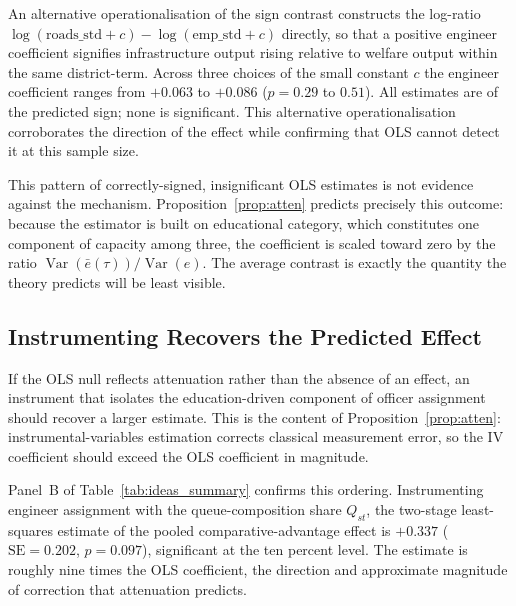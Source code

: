 An alternative operationalisation of the sign contrast constructs the log-ratio
$\log(\text{roads\_std} + c) - \log(\text{emp\_std} + c)$ directly, so that a positive
engineer coefficient signifies infrastructure output rising relative to welfare output
within the same district-term. Across three choices of the small constant $c$ the
engineer coefficient ranges from $+0.063$ to $+0.086$ ($p=0.29$ to $0.51$). All
estimates are of the predicted sign; none is significant. This alternative operationalisation
corroborates the direction of the effect while confirming that OLS cannot detect it at
this sample size.

This pattern of correctly-signed, insignificant OLS estimates is not evidence against
the mechanism. Proposition~\ref{prop:atten} predicts precisely this outcome: because the
estimator is built on educational category, which constitutes one component of capacity
among three, the coefficient is scaled toward zero by the ratio
$\operatorname{Var}(\bar{e}(\tau))/\operatorname{Var}(e)$. The average contrast is
exactly the quantity the theory predicts will be least visible.

\subsection{Instrumenting Recovers the Predicted Effect}
\label{sec:results-iv}

If the OLS null reflects attenuation rather than the absence of an effect, an instrument
that isolates the education-driven component of officer assignment should recover a
larger estimate. This is the content of Proposition~\ref{prop:atten}: instrumental-variables
estimation corrects classical measurement error, so the IV coefficient should exceed the
OLS coefficient in magnitude.

Panel~B of Table~\ref{tab:ideas_summary} confirms this ordering. Instrumenting engineer
assignment with the queue-composition share $Q_{st}$, the two-stage least-squares
estimate of the pooled comparative-advantage effect is $+0.337$
($\text{SE}=0.202$, $p=0.097$), significant at the ten percent level. The estimate is
roughly nine times the OLS coefficient, the direction and approximate magnitude of
correction that attenuation predicts.

